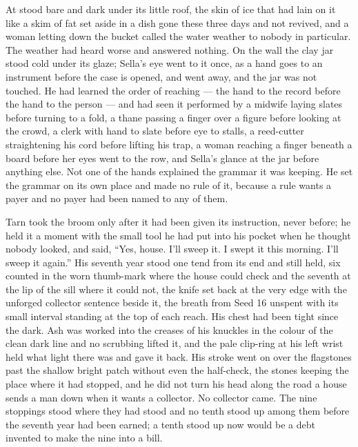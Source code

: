 At   stood bare and dark under its little roof, the skin of ice that had lain on it like a skim of fat set aside in a dish gone these three days and not revived, and a woman letting down the bucket called the water weather to nobody in particular. The weather had heard worse and answered nothing. On the wall the clay jar stood cold under its glaze; Sella's eye went to it once, as a hand goes to an instrument before the case is opened, and went away, and the jar was not touched. He had learned the order of reaching --- the hand to the record before the hand to the person --- and had seen it performed by a midwife laying slates before turning to a fold, a thane passing a finger over a figure before looking at the crowd, a clerk with hand to slate before eye to stalls, a reed-cutter straightening his cord before lifting his trap, a woman reaching a finger beneath a board before her eyes went to the row, and Sella's glance at the jar before anything else. Not one of the hands explained the grammar it was keeping. He set the grammar on its own place and made no rule of it, because a rule wants a payer and no payer had been named to any of them.

Tarn took the broom only after it had been given its instruction, never before; he held it a moment with the small tool he had put into his pocket when he thought nobody looked, and said, “Yes, house. I'll sweep it. I swept it this morning. I'll sweep it again.” His seventh year stood one tend from its end and still held, six counted in the worn thumb-mark where the house could check and the seventh at the lip of the sill where it could not, the knife set back at the very edge with the unforged collector sentence beside it, the breath from Seed 16 unspent with its small interval standing at the top of each reach. His chest had been tight since the dark. Ash was worked into the creases of his knuckles in the colour of the clean dark line and no scrubbing lifted it, and the pale clip-ring at his left wrist held what light there was and gave it back. His stroke went on over the flagstones past the shallow bright patch without even the half-check, the stones keeping the place where it had stopped, and he did not turn his head along the road a house sends a man down when it wants a collector. No collector came. The nine stoppings stood where they had stood and no tenth stood up among them before the seventh year had been earned; a tenth stood up now would be a debt invented to make the nine into a bill.

